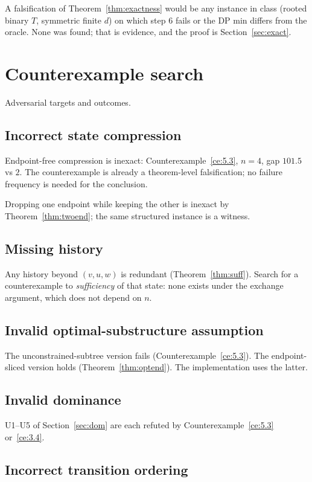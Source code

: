 \documentclass[11pt]{article}
\theoremstyle{plain}
\begin{document}
A falsification of Theorem~\ref{thm:exactness} would be any instance in class
(rooted binary \(T\), symmetric finite \(d\)) on which step 6 fails or the DP
min differs from the oracle. None was found; that is evidence, and the proof is
Section~\ref{sec:exact}.


\section{Counterexample search}

Adversarial targets and outcomes.

\subsection{Incorrect state compression}

Endpoint-free compression is inexact: Counterexample~\ref{ce:5.3}, \(n=4\), gap
\(101.5\) vs \(2\). The counterexample is already a theorem-level falsification;
no failure frequency is needed for the conclusion.

Dropping one endpoint while keeping the other is inexact by
Theorem~\ref{thm:twoend}; the same structured instance is a witness.

\subsection{Missing history}

Any history beyond \((v,u,w)\) is redundant
(Theorem~\ref{thm:suff}). Search for a counterexample to \emph{sufficiency} of
that state: none exists under the exchange argument, which does not depend on
\(n\).

\subsection{Invalid optimal-substructure assumption}

The unconstrained-subtree version fails
(Counterexample~\ref{ce:5.3}). The endpoint-sliced version holds
(Theorem~\ref{thm:optend}). The implementation uses the latter.

\subsection{Invalid dominance}

U1--U5 of Section~\ref{sec:dom} are each refuted by
Counterexample~\ref{ce:5.3} or~\ref{ce:3.4}.

\subsection{Incorrect transition ordering}
\end{document}
